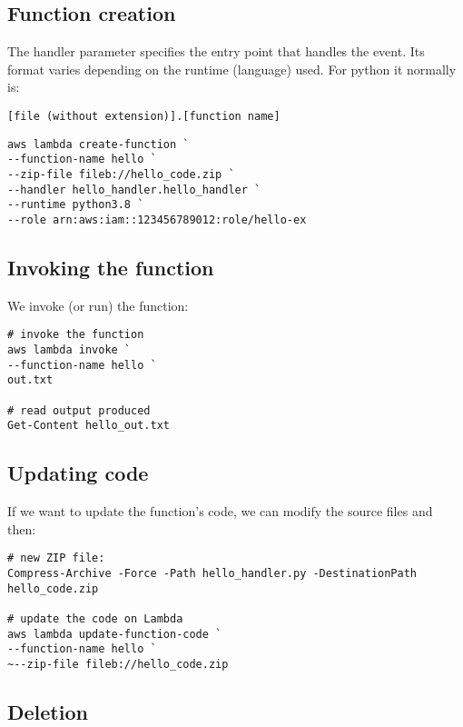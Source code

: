 \documentclass[slides]{pgnotes}
\begin{document}
\subsection{Function creation}\label{function-creation}

The handler parameter specifies the entry point that handles the event.
Its format varies depending on the runtime (language) used. For python
it normally is:

\begin{verbatim}
[file (without extension)].[function name]
\end{verbatim}

\begin{verbatim}
aws lambda create-function `
--function-name hello `
--zip-file fileb://hello_code.zip `
--handler hello_handler.hello_handler `
--runtime python3.8 `
--role arn:aws:iam::123456789012:role/hello-ex 
\end{verbatim}

\subsection{Invoking the function}\label{invoking-the-function}

We invoke (or run) the function:

\begin{verbatim}
# invoke the function
aws lambda invoke `
--function-name hello `
out.txt

# read output produced
Get-Content hello_out.txt 
\end{verbatim}

\subsection{Updating code}\label{updating-code}

If we want to update the function's code, we can modify the source files
and then:

\begin{verbatim}
# new ZIP file:
Compress-Archive -Force -Path hello_handler.py -DestinationPath hello_code.zip

# update the code on Lambda
aws lambda update-function-code `
--function-name hello `
~--zip-file fileb://hello_code.zip 
\end{verbatim}

\subsection{Deletion}\label{deletion}
\end{document}
